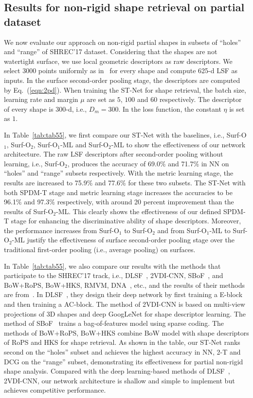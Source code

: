 \documentclass[runningheads]{llncs}
\begin{document}
\subsection{Results for  non-rigid shape retrieval on partial dataset}
We now evaluate our approach on non-rigid partial shapes in subsets of ``holes'' and ``range'' of SHREC'17 dataset. Considering that the shapes are not watertight surface, we use local geometric descriptors as raw descriptors. We select 3000 points uniformly as in~\cite{Osada2002Shape} for every shape and compute 625-d LSF as inputs. In the surface second-order pooling stage, the descriptors are computed by Eq.~(\ref{eqn:2pd}). When training the ST-Net for shape retrieval, the batch size, learning rate and margin $\mu$ are set as $5$, $100$ and $60$ respectively. The descriptor of every shape is $300$-d, i.e., $D_m = 300$.  In the loss function, the constant $\eta$ is set as $1$. 

In Table~\ref{tab:tab55}, we first compare our ST-Net with the baselines, i.e., Surf-O$_1$, Surf-O$_2$, Surf-O$_1$-ML and Surf-O$_2$-ML to show the effectiveness of our network architecture.  The raw LSF descriptors after second-order pooling without learning, i.e., Surf-O$_2$, produces the accuracy of 69.0\% and 71.7\% in NN on ``holes'' and ``range'' subsets respectively. With the metric learning stage, the results are increased to 75.9\% and 77.6\% for these two subsets. The ST-Net with both SPDM-T stage and metric learning stage increases the accuracies to be 96.1\% and 97.3\% respectively, with around 20 percent improvement than the results of Surf-O$_2$-ML. This clearly shows the effectiveness of our defined SPDM-T stage for enhancing the discriminative ability of shape descriptors. 
Moreover, the performance increases from Surf-O$_1$ to Surf-O$_2$ and from Surf-O$_1$-ML to Surf-O$_2$-ML justify the effectiveness of surface second-order pooling stage over the traditional first-order pooling (i.e., average pooling) on surfaces.

In Table~\ref{tab:tab55}, we also compare our results with the methods that participate to the SHREC'17 track, i.e., DLSF~\cite{Furuya2016Deep}, 2VDI-CNN, SBoF~\cite{Litman2014Supervised}, and BoW+RoPS, BoW+HKS,  RMVM\cite{RMVM}, DNA~\cite{reuter2006laplacebeltrami}, etc., and  the results of their methods are from~\cite{Masoumi2017SHREC}. In DLSF~\cite{Furuya2016Deep}, they design their deep network by first training a E-block and then training a AC-block. The method of 2VDI-CNN is based on multi-view projections of 3D shapes and deep GoogLeNet\cite{szegedy2015going}  for shape descriptor learning. The method of SBoF~\cite{Litman2014Supervised} trains a bag-of-features model using sparse coding. The methods of BoW+RoPS, BoW+HKS combine BoW model with shape descriptors of RoPS and HKS  for shape retrieval. 
As shown in the table, our ST-Net ranks  second on the ``holes'' subset and achieves  the highest accuracy in NN, 2-T and DCG on the ``range'' subset, demonstrating its effectiveness for partial non-rigid shape analysis.  Compared with the deep learning-based methods of DLSF~\cite{Furuya2016Deep}, 2VDI-CNN, our network architecture is shallow and simple to implement but achieves competitive performance. 
\end{document}
